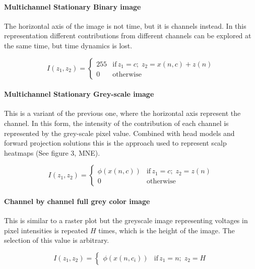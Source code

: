 \paragraph{Multichannel Stationary Binary image}

The horizontal axis of the image is not time, but it is channels instead.   In this representation different contributions from different channels can be explored at the same time, but time dynamics is lost.  

\begin{equation}
I(z_1,z_2) = \left\{ \begin{array}{rl}
255 & \text{if} \,  z_1 = c; \; z_2 =  x(n,c) + z(n) \\
0   & \mbox{otherwise}
\end{array}\right.
\label{eq:images}
\end{equation}

\paragraph{Multichannel Stationary Grey-scale image}

This is a variant of the previous one, where the horizontal axis represent the channel.   In this form, the intensity of the contribution of each channel is represented by the grey-scale pixel value.  Combined with head models and forward projection solutions this is the approach used to represent scalp heatmaps (See figure 3, MNE).

\begin{equation}
I(z_1,z_2) = \left\{ \begin{array}{rl}
\phi(x(n,c)) & \text{if} \,  z_1 = c; \; z_2 =  z(n) \\
0   & \mbox{otherwise}
\end{array}\right.
\label{eq:images}
\end{equation}


\paragraph{Channel by channel full grey color image}

This is similar to a raster plot but the greyscale image representing voltages in pixel intensities is repeated $H$ times, which is the height of the image.  The selection of this value is arbitrary.

\begin{equation}
I(z_1,z_2) = \left\{ \begin{array}{rl} \phi(x(n,c_i))  & \text{if} \,  z_1 = n; \; z_2 = H \end{array}\right.
\label{eq:images}
\end{equation}

